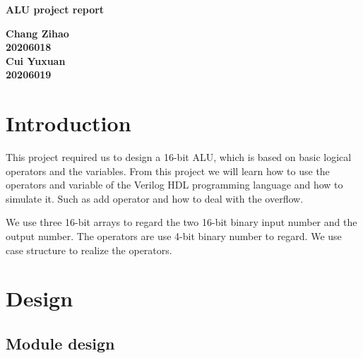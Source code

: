 \documentclass[12pt,a4paper]{article}
\begin{document}
\begin{titlepage}
  \begin{center}
    \vspace*{1cm}

    \textbf{\Huge ALU project report}

    \vspace{0.5cm}

         
    \vspace{1.5cm}

    \textbf{\large Chang Zihao \\20206018\\\large Cui Yuxuan\\20206019}

    \vfill
         

         
    \vspace{0.8cm}
  


         
\end{center}
\end{titlepage}


\newpage
\tableofcontents
\thispagestyle{empty}

\newpage
{}
\setcounter{page}{1}

\section{Introduction}

This project required us to design a 16-bit ALU, which is based on basic logical operators and the variables.
From this project we will learn how to use the operators and variable of the Verilog HDL programming language and how to simulate it.
Such as add operator and how to deal with the overflow.

We use three 16-bit arrays to regard the two 16-bit binary input number and the output number.
The operators are use 4-bit binary number to regard.
We use case structure to realize the operators.

\newpage

\section{Design}
\subsection{Module design}
\end{document}
